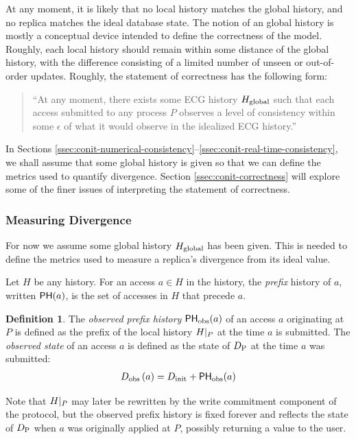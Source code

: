 \documentclass[]             %
{NASA}                       %
\theoremstyle{definition}
\newtheorem{definition}[theorem]{Definition}
\begin{document}
At any moment, it is likely that no local history matches the global
history, and no replica matches the ideal database state. The notion
of an global history is mostly a conceptual device intended to define
the correctness of the model.  Roughly, each local history should
remain within some distance of the global history, with the difference
consisting of a limited number of unseen or out-of-order
updates. Roughly, the statement of correctness has the following form:

\begin{quote}
  ``At any moment, there exists some ECG history $H_\mathrm{global}$ such that
  each access submitted to any process $P$ observes a level of
  consistency within some $\epsilon$ of what it would observe in the
  idealized ECG history.''
\end{quote}

In Sections
\ref{ssec:conit-numerical-consistency}--\ref{ssec:conit-real-time-consistency},
we shall assume that some global history is given so that we can
define the metrics used to quantify divergence. Section
\ref{ssec:conit-correctness} will explore some of the finer issues of
interpreting the statement of correctness.

\subsubsection{Measuring Divergence}
\label{sssec:conit-divergence}
For now we assume some global history $H_\mathrm{global}$ has been given. This
is needed to define the metrics used to measure a replica's divergence
from its ideal value.

Let $H$ be any history. For an access $a \in H$ in the history, the
\emph{prefix} history of $a$, written $\mathsf{PH}{\left(a\right)}$, is the
set of accesses in $H$ that precede $a$.

\begin{definition}
  The \emph{observed prefix history} $\mathsf{PH}_{\mathrm{obs}}{\left(a\right)}$ of an
  access $a$ originating at $P$ is defined as the prefix of the local
  history $H|_{P}$ at the time $a$ is submitted. The
  \emph{observed state} of an access $a$ is defined as the state of
  $D_{\textrm{P}}$ at the time $a$ was submitted:
  \begin{gather}
    D_{\textrm{obs}}\left(a\right) = D_\textrm{init} + \mathsf{PH}_{\mathrm{obs}}{\left(a\right)} \label{eq:conit-D-obs-at}
  \end{gather}
\end{definition}


Note that $H|_{P}$ may later be rewritten by the write
commitment component of the protocol, but the observed prefix history
is fixed forever and reflects the state of $D_{\textrm{P}}$ when $a$ was
originally applied at $P$, possibly returning a value to the user.
\end{document}
